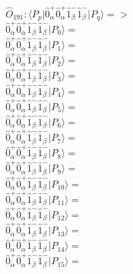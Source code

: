 \documentclass[14pt]{article}
\begin{document}
    $\hat{O}_{191}:  \langle{P_p}\vert \hat{0}_{\alpha}^{+}\hat{0}_{\alpha}^{+}\hat{1}_{\beta}^{-}\hat{1}_{\beta}^{-} \vert{P_q}\rangle => $ \\ 
    $ \hat{0}_{\alpha}^{+}\hat{0}_{\alpha}^{+}\hat{1}_{\beta}^{-}\hat{1}_{\beta}^{-} \vert{P_{0}}\rangle =  $ \\ 
    $ \hat{0}_{\alpha}^{+}\hat{0}_{\alpha}^{+}\hat{1}_{\beta}^{-}\hat{1}_{\beta}^{-} \vert{P_{1}}\rangle =  $ \\ 
    $ \hat{0}_{\alpha}^{+}\hat{0}_{\alpha}^{+}\hat{1}_{\beta}^{-}\hat{1}_{\beta}^{-} \vert{P_{2}}\rangle =  $ \\ 
    $ \hat{0}_{\alpha}^{+}\hat{0}_{\alpha}^{+}\hat{1}_{\beta}^{-}\hat{1}_{\beta}^{-} \vert{P_{3}}\rangle =  $ \\ 
    $ \hat{0}_{\alpha}^{+}\hat{0}_{\alpha}^{+}\hat{1}_{\beta}^{-}\hat{1}_{\beta}^{-} \vert{P_{4}}\rangle =  $ \\ 
    $ \hat{0}_{\alpha}^{+}\hat{0}_{\alpha}^{+}\hat{1}_{\beta}^{-}\hat{1}_{\beta}^{-} \vert{P_{5}}\rangle =  $ \\ 
    $ \hat{0}_{\alpha}^{+}\hat{0}_{\alpha}^{+}\hat{1}_{\beta}^{-}\hat{1}_{\beta}^{-} \vert{P_{6}}\rangle =  $ \\ 
    $ \hat{0}_{\alpha}^{+}\hat{0}_{\alpha}^{+}\hat{1}_{\beta}^{-}\hat{1}_{\beta}^{-} \vert{P_{7}}\rangle =  $ \\ 
    $ \hat{0}_{\alpha}^{+}\hat{0}_{\alpha}^{+}\hat{1}_{\beta}^{-}\hat{1}_{\beta}^{-} \vert{P_{8}}\rangle =  $ \\ 
    $ \hat{0}_{\alpha}^{+}\hat{0}_{\alpha}^{+}\hat{1}_{\beta}^{-}\hat{1}_{\beta}^{-} \vert{P_{9}}\rangle =  $ \\ 
    $ \hat{0}_{\alpha}^{+}\hat{0}_{\alpha}^{+}\hat{1}_{\beta}^{-}\hat{1}_{\beta}^{-} \vert{P_{10}}\rangle =  $ \\ 
    $ \hat{0}_{\alpha}^{+}\hat{0}_{\alpha}^{+}\hat{1}_{\beta}^{-}\hat{1}_{\beta}^{-} \vert{P_{11}}\rangle =  $ \\ 
    $ \hat{0}_{\alpha}^{+}\hat{0}_{\alpha}^{+}\hat{1}_{\beta}^{-}\hat{1}_{\beta}^{-} \vert{P_{12}}\rangle =  $ \\ 
    $ \hat{0}_{\alpha}^{+}\hat{0}_{\alpha}^{+}\hat{1}_{\beta}^{-}\hat{1}_{\beta}^{-} \vert{P_{13}}\rangle =  $ \\ 
    $ \hat{0}_{\alpha}^{+}\hat{0}_{\alpha}^{+}\hat{1}_{\beta}^{-}\hat{1}_{\beta}^{-} \vert{P_{14}}\rangle =  $ \\ 
    $ \hat{0}_{\alpha}^{+}\hat{0}_{\alpha}^{+}\hat{1}_{\beta}^{-}\hat{1}_{\beta}^{-} \vert{P_{15}}\rangle =  $ \\ 
    
\end{document}
